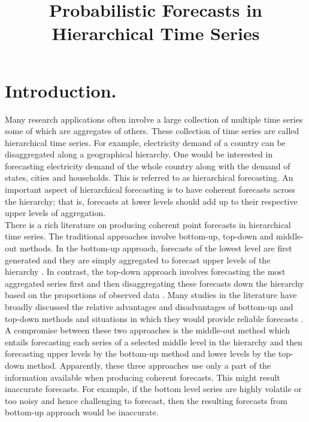 \documentclass[a4paper, 11pt]{article}
\begin{document}
\title{Probabilistic Forecasts in Hierarchical Time Series}
\maketitle


\section{Introduction.}
Many research applications often involve a large collection of multiple time series some of which are aggregates of others.
These collection of time series are called hierarchical time series. For example, electricity demand of a country can be disaggregated along a geographical hierarchy. One would be interested in forecasting electricity demand of the whole country along with the demand of states, cities and households. This is referred to as hierarchical forecasting. An important aspect of hierarchical forecasting is to have coherent forecasts across the hierarchy; that is, forecasts at lower levels should add up to their respective upper levels of aggregation.\\ 

\noindent
There is a rich literature on producing coherent point forecasts in hierarchical time series. The traditional approaches involve bottom-up, top-down and middle-out methods. In the bottom-up approach, forecasts of the lowest level are first generated and they are simply aggregated to forecast upper levels of the hierarchy \citep{Dunn1976}.  
In contrast, the top-down approach involves forecasting the most aggregated series first and then disaggregating these forecasts down the hierarchy based on the proportions of observed data \citep{Gross1990}. 
Many studies in the literature have broadly discussed the relative advantages and disadvantages of bottom-up and top-down methods and situations in which they would provide reliable forecasts \citep{Schwarzkopf1988,Kahn1998, Lapide1998,Fliedner2001}.
A compromise between these two approaches is the middle-out method which entails forecasting each series of a selected middle level in the hierarchy and then forecasting upper levels by the bottom-up method and lower levels by the top-down method. Apparently, these three approaches use only a part of the information available when producing coherent forecasts. This might result inaccurate forecasts. For example, if the bottom level series are highly volatile or too noisy and hence challenging to forecast, then the resulting forecasts from bottom-up approach would be inaccurate.\\
\end{document}
